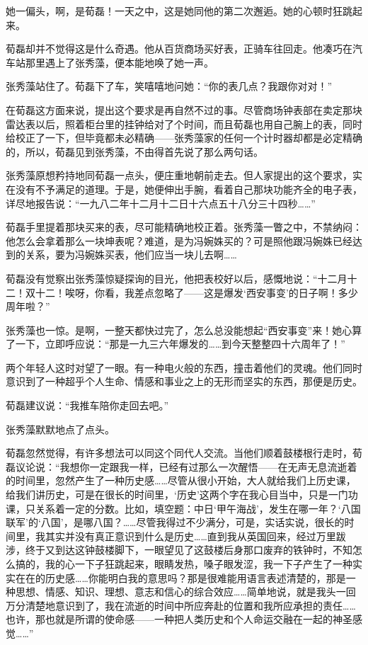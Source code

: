 \par 她一偏头，啊，是荀磊！一天之中，这是她同他的第二次邂逅。她的心顿时狂跳起来。
\par 荀磊却并不觉得这是什么奇遇。他从百货商场买好表，正骑车往回走。他凑巧在汽车站那里遇上了张秀藻，便本能地唤了她一声。
\par 张秀藻站住了。荀磊下了车，笑嘻嘻地问她：“你的表几点？我跟你对对！”
\par 在荀磊这方面来说，提出这个要求是再自然不过的事。尽管商场钟表部在卖定那块雷达表以后，照着柜台里的挂钟给对了个时间，而且荀磊也用自己腕上的表，同时给校正了一下，但毕竟都未必精确——张秀藻家的任何一个计时器却都是必定精确的，所以，荀磊见到张秀藻，不由得首先说了那么两句话。
\par 张秀藻原想矜持地同荀磊一点头，便庄重地朝前走去。但人家提出的这个要求，实在没有不予满足的道理。于是，她便伸出手腕，看着自己那块功能齐全的电子表，详尽地报告说：“一九八二年十二月十二日十六点五十八分三十四秒……”
\par 荀磊手里提着那块买来的表，尽可能精确地校正着。张秀藻一瞥之中，不禁纳闷：他怎么会拿着那么一块坤表呢？难道，是为冯婉姝买的？可是照他跟冯婉姝已经达到的关系，要为冯婉姝买表，他们应当一块儿去啊……
\par 荀磊没有觉察出张秀藻惊疑探询的目光，他把表校好以后，感慨地说：“十二月十二！双十二！唉呀，你看，我差点忽略了——这是爆发‘西安事变’的日子啊！多少周年啦？”
\par 张秀藻也一惊。是啊，一整天都快过完了，怎么总没能想起“西安事变”来！她心算了一下，立即呼应说：“那是一九三六年爆发的……到今天整整四十六周年了！”
\par 两个年轻人这时对望了一眼。有一种电火般的东西，撞击着他们的灵魂。他们同时意识到了一种超乎个人生命、情感和事业之上的无形而坚实的东西，那便是历史。
\par 荀磊建议说：“我推车陪你走回去吧。”
\par 张秀藻默默地点了点头。
\par 荀磊忽然觉得，有许多想法可以同这个同代人交流。当他们顺着鼓楼根行走时，荀磊议论说：“我想你一定跟我一样，已经有过那么一次醒悟——在无声无息流逝着的时间里，忽然产生了一种历史感……尽管从很小开始，大人就给我们上历史课，给我们讲历史，可是在很长的时间里，‘历史’这两个字在我心目当中，只是一门功课，只关系着一定的分数。比如，填空题：中日‘甲午海战’，发生在哪一年？‘八国联军’的‘八国’，是哪八国？……尽管我得过不少满分，可是，实话实说，很长的时间里，我其实并没有真正意识到什么是历史……直到我从英国回来，经过万里跋涉，终于又到达这钟鼓楼脚下，一眼望见了这鼓楼后身那口废弃的铁钟时，不知怎么搞的，我的心一下子狂跳起来，眼睛发热，嗓子眼发涩，我一下子产生了一种实实在在的历史感……你能明白我的意思吗？那是很难能用语言表述清楚的，那是一种思想、情感、知识、理想、意志和信心的综合效应……简单地说，就是我头一回万分清楚地意识到了，我在流逝的时间中所应奔赴的位置和我所应承担的责任……也许，那也就是所谓的使命感——一种把人类历史和个人命运交融在一起的神圣感觉……”
